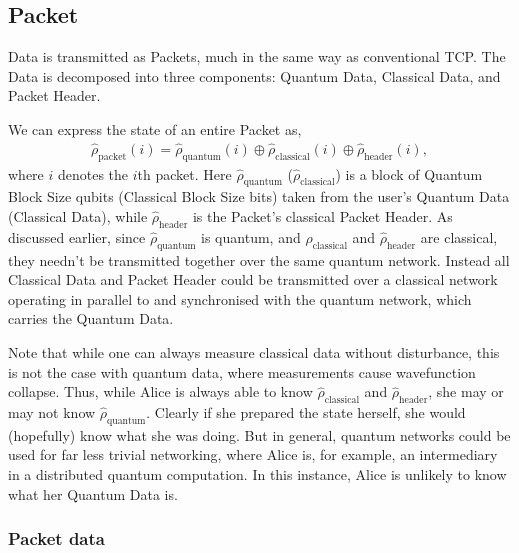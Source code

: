 \documentclass[aps,rmp,twocolumn,amsmath,amssymb,nofootinbib,superscriptaddress]{revtex4}
\begin{document}
%
%

\subsection{Packet}

{\sc Data} is transmitted as {\sc Packets}, much in the same way as conventional TCP. The {\sc Data} is decomposed into three components: {\sc Quantum Data}, {\sc Classical Data}, and {\sc Packet Header}.

We can express the state of an entire {\sc Packet} as,
\begin{align}
\hat\rho_\mathrm{packet}(i) = \hat\rho_\mathrm{quantum}(i) \oplus \hat\rho_\mathrm{classical}(i) \oplus \hat\rho_\mathrm{header}(i),
\end{align}
where $i$ denotes the $i$th packet. Here $\hat\rho_\mathrm{quantum}$ ($\hat\rho_\mathrm{classical}$) is a block of {\sc Quantum Block Size} qubits ({\sc Classical Block Size} bits) taken from the user's {\sc Quantum Data} ({\sc Classical Data}), while $\hat\rho_\mathrm{header}$ is the {\sc Packet's} classical {\sc Packet Header}. As discussed earlier, since $\hat\rho_\mathrm{quantum}$ is quantum, and $\hat\rho_\mathrm{classical}$ and $\hat\rho_\mathrm{header}$ are classical, they needn't be transmitted together over the same quantum network. Instead all {\sc Classical Data} and {\sc Packet Header} could be transmitted over a classical network operating in parallel to and synchronised with the quantum network, which carries the {\sc Quantum Data}.

Note that while one can always measure classical data without disturbance, this is not the case with quantum data, where measurements cause wavefunction collapse. Thus, while Alice is always able to know $\hat\rho_\mathrm{classical}$ and $\hat\rho_\mathrm{header}$, she may or may not know $\hat\rho_\mathrm{quantum}$. Clearly if she prepared the state herself, she would (hopefully) know what she was doing. But in general, quantum networks could be used for far less trivial networking, where Alice is, for example, an intermediary in a distributed quantum computation. In this instance, Alice is unlikely to know what her {\sc Quantum Data} is.

%
%

\subsubsection{Packet data}
\end{document}

